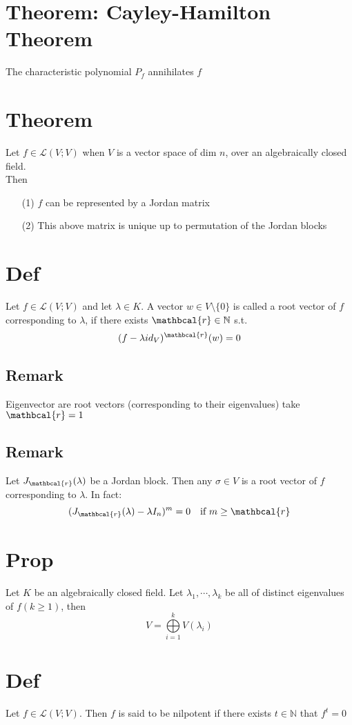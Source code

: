 \documentclass{book}
\begin{document}
\section{Theorem: Cayley-Hamilton Theorem}
The characteristic polynomial $P_f$ annihilates $f$
\section{Theorem}Let $f\in\mathscr{L}(V;V)$ when $V$ is a vector space of dim $n$, over an algebraically closed field.\\Then
\begin{itemize}
    \item [(1)]$f$ can be represented by a Jordan matrix
    \item [(2)]This above matrix is unique up to permutation of the Jordan blocks
\end{itemize}
\section{Def}
Let $f\in\mathscr{L}(V;V)$ and let $\lambda\in K$. A vector $w\in V\setminus\{0\}$ is called a root vector of $f$ corresponding to $\lambda$, if there exists $\mathbcal{r}\in\mathbb{N}$ s.t. $$(f-\lambda id_V)^\mathbcal{r}(w)=0$$
\subsection*{Remark}
Eigenvector are root vectors (corresponding to their eigenvalues) take $\mathbcal{r}=1$

\subsection*{Remark}
Let $J_\mathbcal{r}(\lambda)$ be a Jordan block. Then any $\sigma\in V$ is a root vector of $f$ corresponding to $\lambda$. In fact:
$$(J_\mathbcal{r}(\lambda)-\lambda I_n)^m=0\quad\text{if }m\geq\mathbcal{r}$$
\section{Prop}
\label{Prop 48.27}
Let $K$ be an algebraically closed field. Let $\lambda_1,\cdots,\lambda_k$ be all of distinct eigenvalues of $f(k\geq1)$, then 
$$V=\bigoplus\limits_{i=1}^kV(\lambda_i)$$
\section{Def}
Let $f\in  \mathscr{L}(V;V)$. Then $f$ is said to be nilpotent if there exists $t\in \mathbb{N}$ that $f^t=0$
\end{document}
